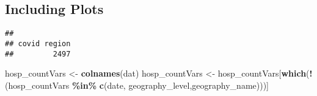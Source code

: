 \documentclass[
]{article}
\newenvironment{Shaded}{\begin{snugshade}}{\end{snugshade}}
\newcommand{\KeywordTok}[1]{\textcolor[rgb]{0.13,0.29,0.53}{\textbf{#1}}}
\newcommand{\NormalTok}[1]{#1}
\newcommand{\OperatorTok}[1]{\textcolor[rgb]{0.81,0.36,0.00}{\textbf{#1}}}
\newcommand{\StringTok}[1]{\textcolor[rgb]{0.31,0.60,0.02}{#1}}
\begin{document}
\hypertarget{including-plots}{%
\subsection{Including Plots}\label{including-plots}}

\begin{Shaded}
\end{Shaded}

\begin{verbatim}
## 
## covid region 
##         2497
\end{verbatim}

\begin{Shaded}
\begin{Highlighting}[]
\NormalTok{hosp\_countVars \textless{}{-}}\StringTok{ }\KeywordTok{colnames}\NormalTok{(dat)}
\NormalTok{hosp\_countVars \textless{}{-}}\StringTok{ }\NormalTok{hosp\_countVars[}\KeywordTok{which}\NormalTok{(}\OperatorTok{!}\NormalTok{(hosp\_countVars }\OperatorTok{\%in\%}\StringTok{ }\KeywordTok{c}\NormalTok{(}\StringTok{\textquotesingle{}date\textquotesingle{}}\NormalTok{, }\StringTok{\textquotesingle{}geography\_level\textquotesingle{}}\NormalTok{,}\StringTok{\textquotesingle{}geography\_name\textquotesingle{}}\NormalTok{)))]}


\end{Highlighting}
\end{Shaded}
\end{document}
